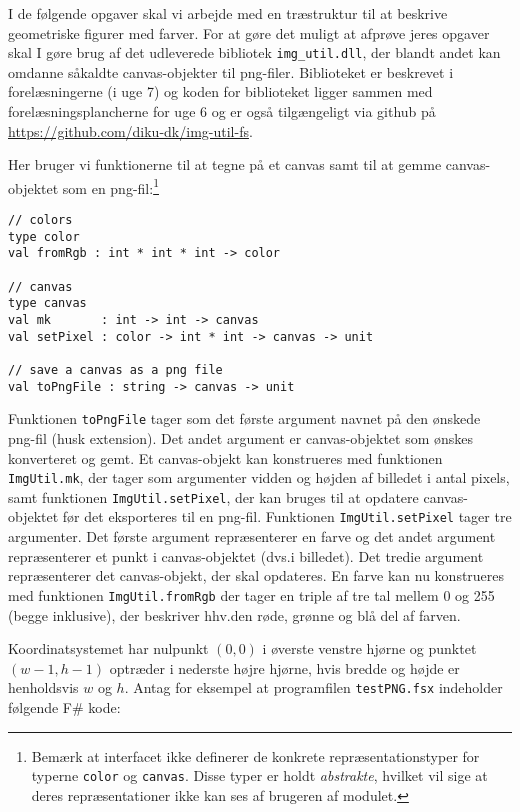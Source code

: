 I de følgende opgaver skal vi arbejde med en træstruktur til at beskrive geometriske
figurer med farver.  For at gøre det muligt at afprøve jeres opgaver
skal I gøre brug af det udleverede bibliotek \texttt{img\_util.dll}, der
blandt andet kan omdanne såkaldte canvas-objekter til png-filer.  Biblioteket er
beskrevet i forelæsningerne (i uge 7) og koden for biblioteket ligger
sammen med forelæsningsplancherne for uge 6 og er også tilgængeligt via github på \url{https://github.com/diku-dk/img-util-fs}.

Her bruger vi funktionerne til at tegne på et canvas samt til at gemme
canvas-objektet som en png-fil:\footnote{Bemærk at interfacet ikke
definerer de konkrete repræsentationstyper for
typerne \lstinline{color} og \lstinline{canvas}. Disse typer er
holdt \emph{abstrakte}, hvilket vil sige at deres repræsentationer
ikke kan ses af brugeren af modulet.}

\begin{lstlisting}[numbers=none,frame=none,mathescape]
// colors
type color
val fromRgb : int * int * int -> color

// canvas
type canvas
val mk       : int -> int -> canvas
val setPixel : color -> int * int -> canvas -> unit

// save a canvas as a png file
val toPngFile : string -> canvas -> unit
\end{lstlisting}

Funktionen \lstinline{toPngFile} tager som det første argument navnet
på den ønskede png-fil (husk extension).  Det andet argument er
canvas-objektet som ønskes konverteret og gemt. Et canvas-objekt kan
konstrueres med funktionen \lstinline{ImgUtil.mk}, der tager som
argumenter vidden og højden af billedet i antal pixels, samt funktionen
\lstinline{ImgUtil.setPixel}, der kan bruges til at opdatere canvas-objektet
før det eksporteres til en png-fil. Funktionen \lstinline{ImgUtil.setPixel}
tager tre argumenter. Det første argument repræsenterer en farve og
det andet argument repræsenterer et punkt i canvas-objektet (dvs.\@ i
billedet). Det tredie argument repræsenterer det canvas-objekt, der
skal opdateres.  En farve kan nu konstrueres med funktionen
\lstinline{ImgUtil.fromRgb} der tager en triple af tre tal mellem 0 og
255 (begge inklusive), der beskriver hhv.\@ den røde, grønne og blå del
af farven.

Koordinatsystemet har nulpunkt $(0,0)$ i øverste venstre hjørne og punktet
$(w-1,h-1)$ optræder i nederste højre hjørne, hvis bredde og højde er henholdsvis $w$
og $h$.  Antag for eksempel at programfilen \texttt{testPNG.fsx}
indeholder følgende F\# kode:

